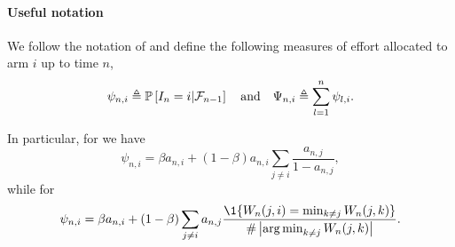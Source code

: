\paragraph{Useful notation}



We follow the notation of \citet{russo2016ttts} and define the following measures of effort allocated to arm $i$ up to time $n$,
\begin{align*}
    \psi_{n,i} \triangleq \mathbb{P}\left[I_n = i | \mathcal{F}_{n-1}\right]\quad \text{and} \quad \Psi_{n,i} \triangleq \sum_{l=1}^n \psi_{l,i}.
\end{align*}

In particular, for \TTTS we have
\[
    \psi_{n,i} =  \beta a_{n,i} + (1-\beta) a_{n,i}\sum_{j\neq i} \frac{a_{n,j}}{1-a_{n,j}},
\]
while for \TCC
\[
    \psi_{n,i} = \beta a_{n,i} + (1-\beta) \sum_{j\neq i} a_{n,j}\frac{\1\{W_n(j,i)=\min_{k\neq j} W_n(j,k)\}}{\#\left|\argmin_{k\neq j } W_n(j,k)\right|}.
\]

